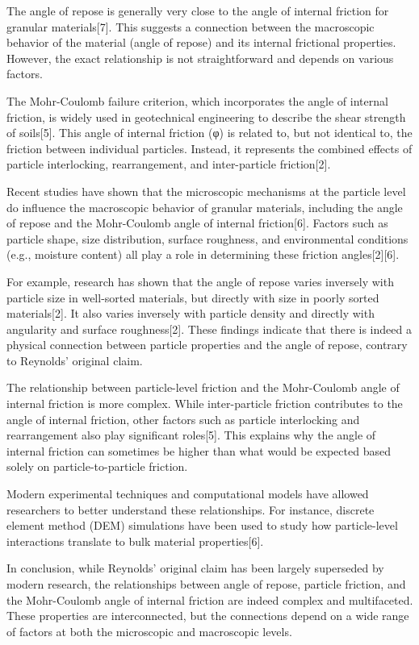 \documentclass[xcolor=dvipsnames,10pt,hidelinks]{article}
\begin{document}
\begin{itemize}
The angle of repose is generally very close to the angle of internal friction for granular materials[7]. This suggests a connection between the macroscopic behavior of the material (angle of repose) and its internal frictional properties. However, the exact relationship is not straightforward and depends on various factors.

The Mohr-Coulomb failure criterion, which incorporates the angle of internal friction, is widely used in geotechnical engineering to describe the shear strength of soils[5]. This angle of internal friction (φ) is related to, but not identical to, the friction between individual particles. Instead, it represents the combined effects of particle interlocking, rearrangement, and inter-particle friction[2].

Recent studies have shown that the microscopic mechanisms at the particle level do influence the macroscopic behavior of granular materials, including the angle of repose and the Mohr-Coulomb angle of internal friction[6]. Factors such as particle shape, size distribution, surface roughness, and environmental conditions (e.g., moisture content) all play a role in determining these friction angles[2][6].

For example, research has shown that the angle of repose varies inversely with particle size in well-sorted materials, but directly with size in poorly sorted materials[2]. It also varies inversely with particle density and directly with angularity and surface roughness[2]. These findings indicate that there is indeed a physical connection between particle properties and the angle of repose, contrary to Reynolds' original claim.

The relationship between particle-level friction and the Mohr-Coulomb angle of internal friction is more complex. While inter-particle friction contributes to the angle of internal friction, other factors such as particle interlocking and rearrangement also play significant roles[5]. This explains why the angle of internal friction can sometimes be higher than what would be expected based solely on particle-to-particle friction.

Modern experimental techniques and computational models have allowed researchers to better understand these relationships. For instance, discrete element method (DEM) simulations have been used to study how particle-level interactions translate to bulk material properties[6].

In conclusion, while Reynolds' original claim has been largely superseded by modern research, the relationships between angle of repose, particle friction, and the Mohr-Coulomb angle of internal friction are indeed complex and multifaceted. These properties are interconnected, but the connections depend on a wide range of factors at both the microscopic and macroscopic levels.


\end{itemize}
\end{document}
